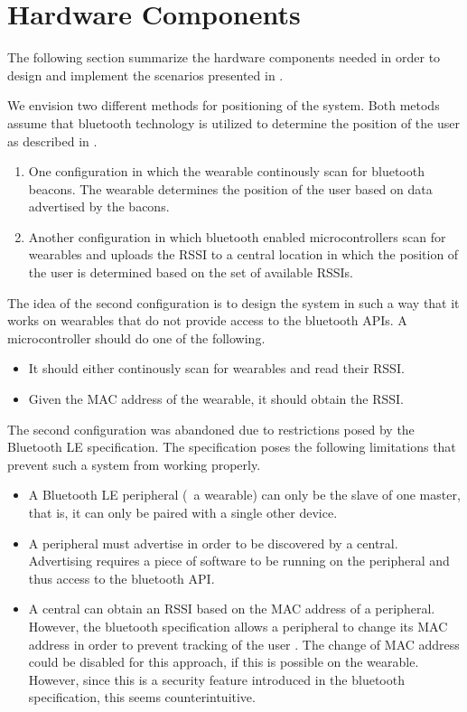 \section{Hardware Components}
\label{sec:analysis:system-components}

The following section summarize the hardware components needed in order to design and implement the scenarios presented in .

We envision two different methods for positioning of the system. Both metods assume that bluetooth technology is utilized to determine the position of the user as described in .

\begin{enumerate}
\item One configuration in which the wearable continously scan for bluetooth beacons. The wearable determines the position of the user based on data advertised by the bacons.
\item Another configuration in which bluetooth enabled microcontrollers scan for wearables and uploads the RSSI to a central location in which the position of the user is determined based on the set of available RSSIs.
\end{enumerate}

The idea of the second configuration is to design the system in such a way that it works on wearables that do not provide access to the bluetooth APIs. A microcontroller should do one of the following.

\begin{itemize}
\item It should either continously scan for wearables and read their RSSI.
\item Given the MAC address of the wearable, it should obtain the RSSI.
\end{itemize}

The second configuration was abandoned due to restrictions posed by the Bluetooth LE specification. The specification poses the following limitations that prevent such a system from working properly.

\begin{itemize}
\item A Bluetooth LE peripheral (\eg~a wearable) can only be the slave of one master, that is, it can only be paired with a single other device.
\item A peripheral must advertise in order to be discovered by a central. Advertising requires a piece of software to be running on the peripheral and thus access to the bluetooth API.
\item A central can obtain an RSSI based on the MAC address of a peripheral. However, the bluetooth specification allows a peripheral to change its MAC address in order to prevent tracking of the user \cite[p.~91]{bluetooth2010bluetooth_vol_1}. The change of MAC address could be disabled for this approach, if this is possible on the wearable. However, since this is a security feature introduced in the bluetooth specification, this seems counterintuitive.
\end{itemize}

